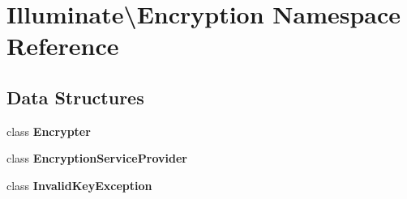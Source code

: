 \section{Illuminate\textbackslash{}Encryption Namespace Reference}
\label{namespace_illuminate_1_1_encryption}
\subsection*{Data Structures}
\begin{DoxyCompactItemize}
\item 
class {\bf Encrypter}
\item 
class {\bf Encryption\+Service\+Provider}
\item 
class {\bf Invalid\+Key\+Exception}
\end{DoxyCompactItemize}
